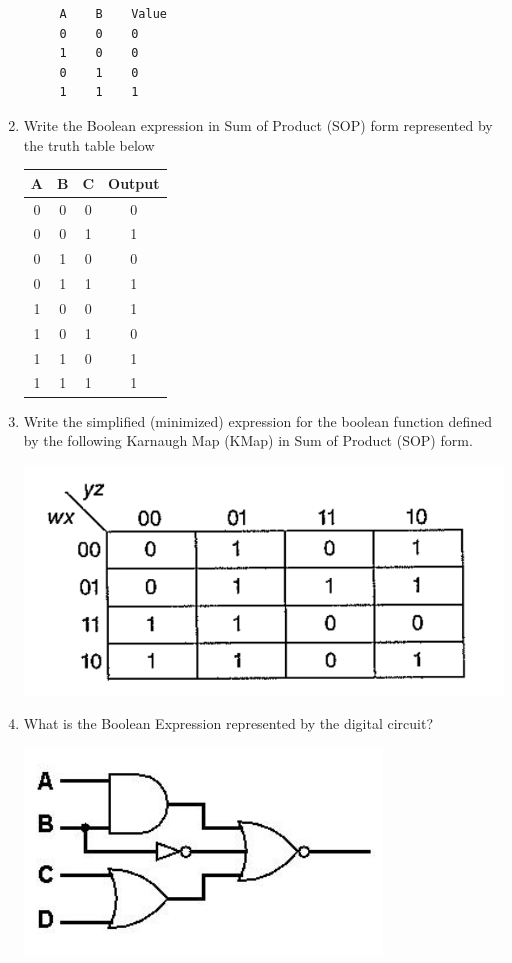 \documentclass[12pt,a4paper,english]{article}
\begin{document}
\begin{enumerate}
  \begin{lstlisting}
     A    B    Value
     0    0    0
     1    0    0
     0    1    0
     1    1    1
   \end{lstlisting}

\item Write the Boolean expression in Sum of Product (SOP) form represented by the truth table below

\begin{tabular}{c | c | c | c }
 \hline
 A & B & C & Output \\ [0.5ex] 
 \hline
 0 & 0 & 0 & 0 \\
 0 & 0 & 1 & 1 \\
 0 & 1 & 0 & 0 \\
 0 & 1 & 1 & 1 \\
 1 & 0 & 0 & 1 \\
 1 & 0 & 1 & 0 \\
 1 & 1 & 0 & 1 \\
 1 & 1 & 1 & 1 \\
\end{tabular}

\item Write the simplified (minimized) expression for the boolean function defined by the following Karnaugh Map (KMap) in Sum of Product (SOP) form.
  
  \includegraphics[scale=.5]{karnaughmap}

\item What is the Boolean Expression represented by the digital circuit?

  \includegraphics[scale=.5]{logiccircuit}
\lnot[(A * B) + \lnot B + (C + D)]


\end{enumerate}
\end{document}
